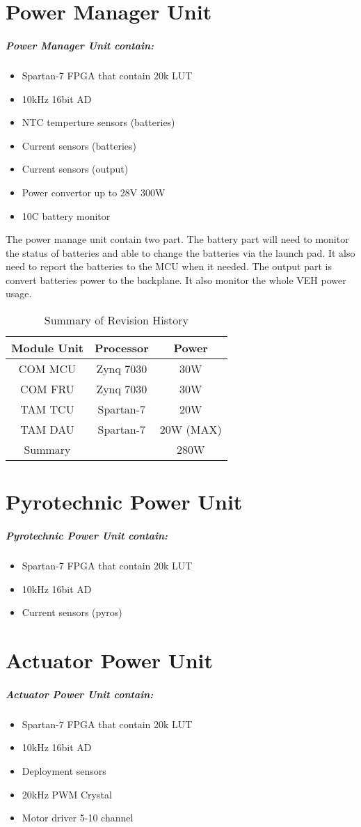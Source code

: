 \documentclass[12pt,article]{memoir}
\begin{document}
\section{Power Manager Unit}
\subparagraph{Power Manager Unit contain:}
\begin{itemize}
	\item Spartan-7 FPGA that contain 20k LUT
	\item 10kHz 16bit AD
	\item NTC temperture sensors  (batteries)
	\item Current sensors  (batteries)
	\item Current sensors  (output)
	\item Power convertor up to 28V 300W
	\item 10C battery monitor
\end{itemize}
The power manage unit contain two part. The battery part will need to monitor the status of batteries and able to change the batteries via the launch pad. It also need to report the batteries to the MCU when it needed. The output part is convert batteries power to the backplane. It also monitor the whole VEH power usage.
\begin{table}[H]
	\centering
	\begin{tabu}{ c | c | c }
		Module Unit & Processor & Power\\ \hline
		 COM MCU & Zynq 7030 & 30W\\
		 COM FRU & Zynq 7030 & 30W\\
		 TAM TCU & Spartan-7 & 20W\\
		 TAM DAU & Spartan-7 & 20W (MAX)\\ \hline
		 Summary &   & 280W\\
	\end{tabu}
	\caption{Summary of Revision History}
	\label{tab:slc}
\end{table}
\section{Pyrotechnic Power Unit}
\subparagraph{Pyrotechnic Power Unit contain:}
\begin{itemize}
	\item Spartan-7 FPGA that contain 20k LUT
	\item 10kHz 16bit AD
	\item Current sensors  (pyros)
\end{itemize}
\section{Actuator Power Unit}
\subparagraph{Actuator Power Unit contain:}
\begin{itemize}
	\item Spartan-7 FPGA that contain 20k LUT
	\item 10kHz 16bit AD
	\item Deployment sensors 
	\item 20kHz PWM Crystal
	\item Motor driver 5-10 channel
\end{itemize}
\end{document}
